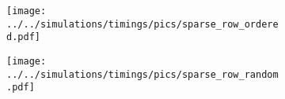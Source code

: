 \documentclass{article}
\begin{document}
\begin{figure}[bt]
    \centering
    \begin{subfigure}[b]{0.49\textwidth}
        \texttt{[image: ../../simulations/timings/pics/sparse\_row\_ordered.pdf]}
        \caption{}
    \end{subfigure}
    \begin{subfigure}[b]{0.49\textwidth}
        \texttt{[image: ../../simulations/timings/pics/sparse\_row\_random.pdf]}
        \caption{}
    \end{subfigure}
\end{figure}
\end{document}
